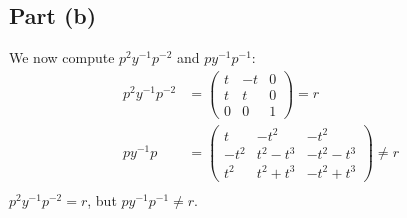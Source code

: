 \documentclass{article}
\begin{document}
\subsection*{Part (b)}
We now compute $p^2y^{-1}p^{-2}$ and $py^{-1}p^{-1}$:
\begin{equation}
    \begin{split}
        p^2y^{-1}p^{-2} & = 
        \begin{pmatrix} 
            t & -t & 0 \\
            t & t & 0  \\
            0 & 0 & 1
        \end{pmatrix} = r \\
        py^{-1}p & =  
        \begin{pmatrix} 
            t & -t^2 & -t^2 \\
            -t^2 & t^2 - t^3 & -t^2 - t^3 \\
            t^2 & t^2 + t^3 & -t^2 + t^3
        \end{pmatrix} \neq r \\
    \end{split}
\end{equation}
$p^2y^{-1}p^{-2} = r$, but $py^{-1}p^{-1} \neq r$.

\clearpage

\problem
\end{document}
